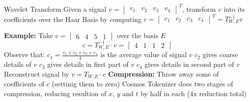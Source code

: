 \documentclass{beamer}
\begin{document}
\begin{frame}[t]{Wavelet Transform}
    Given a signal $v =\begin{vmatrix} v_1 & v_2 & v_3 & v_4 \end{vmatrix}^T$, transform 
    $v$ into its coefficients over the Haar Basis by computing $c=\begin{vmatrix} c_1 & c_2 & c_3 & c_4 \end{vmatrix}^T= T_{W,E}^{-1} v$ \newline

    \textbf{Example:}
    Take $v = \begin{vmatrix} 6 & 4 & 5 & 1 \end{vmatrix} $ over the basis $E$
    \[c= T_{W,E}^{-1} \cdot v = \begin{vmatrix} 4 & 1 & 1 & 2 \end{vmatrix}\] 
    Observe that: $c_1 =\frac{v_1 + v_2 + v_3 + v_4}{4}$ is the average value of signal $v$ %
    \newline
    $c_2$ gives coarse details of $v$ \newline 
    $c_3$ gives details in first part of $v$ \newline
    $c_4$ gives details in second part of $v$ \newline
    Reconstruct signal by $v = T_{W,E} \cdot c$ \newline
    \newline
    \textbf{Compression:} Throw away some of coefficients of $c$ (settinig them to zero)
    \newline
    Cosmos Tokenizer does two stages of compression, reducing resultion of $x$, $y$ and $t$ by half in each (4x reduction total)\newline
\end{frame} 
\end{document}
